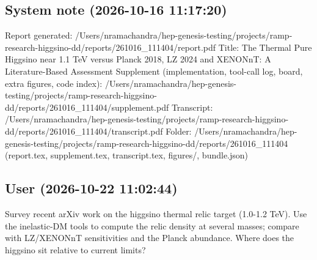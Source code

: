 \documentclass[11pt,a4paper]{article}
\begin{document}
\subsection*{System note \small(2026-10-16 11:17:20)}
Report generated: /Users/nramachandra/hep-genesis-testing/projects/ramp-research-higgsino-dd/reports/261016\_111404/report.pdf Title: The Thermal Pure Higgsino near 1.1 TeV versus Planck 2018, LZ 2024 and XENONnT: A Literature-Based Assessment Supplement (implementation, tool-call log, board, extra figures, code index): /Users/nramachandra/hep-genesis-testing/projects/ramp-research-higgsino-dd/reports/261016\_111404/supplement.pdf Transcript: /Users/nramachandra/hep-genesis-testing/projects/ramp-research-higgsino-dd/reports/261016\_111404/transcript.pdf Folder: /Users/nramachandra/hep-genesis-testing/projects/ramp-research-higgsino-dd/reports/261016\_111404 (report.tex, supplement.tex, transcript.tex, figures/, bundle.json)

\subsection*{User \small(2026-10-22 11:02:44)}
Survey recent arXiv work on the higgsino thermal relic target (1.0-1.2 TeV). Use the inelastic-DM tools to compute the relic density at several masses; compare with LZ/XENONnT sensitivities and the Planck abundance. Where does the higgsino sit relative to current limits?
\end{document}

